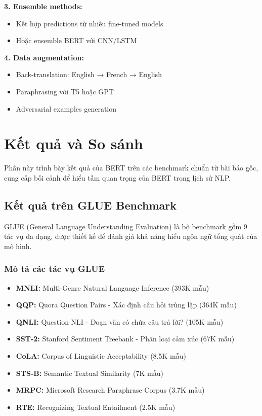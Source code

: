 \textbf{3. Ensemble methods:}
\begin{itemize}
    \item Kết hợp predictions từ nhiều fine-tuned models
    \item Hoặc ensemble BERT với CNN/LSTM
\end{itemize}

\textbf{4. Data augmentation:}
\begin{itemize}
    \item Back-translation: English → French → English
    \item Paraphrasing với T5 hoặc GPT
    \item Adversarial examples generation
\end{itemize}

\section{Kết quả và So sánh}
\label{sec:ket_qua_so_sanh}
Phần này trình bày kết quả của BERT trên các benchmark chuẩn từ bài báo gốc, cung cấp bối cảnh để hiểu tầm quan trọng của BERT trong lịch sử NLP.

\subsection{Kết quả trên GLUE Benchmark}
\label{ssec:ket_qua_glue}
GLUE (General Language Understanding Evaluation) là bộ benchmark gồm 9 tác vụ đa dạng, được thiết kế để đánh giá khả năng hiểu ngôn ngữ tổng quát của mô hình.

\subsubsection{Mô tả các tác vụ GLUE}
\begin{itemize}
    \item \textbf{MNLI:} Multi-Genre Natural Language Inference (393K mẫu)
    \item \textbf{QQP:} Quora Question Pairs - Xác định câu hỏi trùng lặp (364K mẫu)
    \item \textbf{QNLI:} Question NLI - Đoạn văn có chứa câu trả lời? (105K mẫu)
    \item \textbf{SST-2:} Stanford Sentiment Treebank - Phân loại cảm xúc (67K mẫu)
    \item \textbf{CoLA:} Corpus of Linguistic Acceptability (8.5K mẫu)
    \item \textbf{STS-B:} Semantic Textual Similarity (7K mẫu)
    \item \textbf{MRPC:} Microsoft Research Paraphrase Corpus (3.7K mẫu)
    \item \textbf{RTE:} Recognizing Textual Entailment (2.5K mẫu)
\end{itemize}

